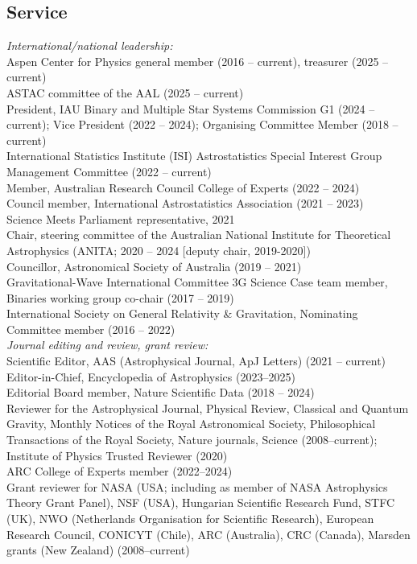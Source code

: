 \documentclass[margin,line]{res}
\begin{document}
\begin{resume}
\section{\sc Service}

{\it International/national leadership:}\\
Aspen Center for Physics general member (2016 -- current), treasurer (2025 -- current)\\
ASTAC committee of the AAL (2025 -- current)\\
President, IAU Binary and Multiple Star Systems Commission G1 (2024 -- current); Vice President (2022 -- 2024); Organising Committee Member (2018 -- current)\\
International Statistics Institute (ISI) Astrostatistics Special Interest Group Management Committee (2022 -- current)\\
Member, Australian Research Council College of Experts (2022 -- 2024)\\
Council member, International Astrostatistics Association (2021 -- 2023)\\
Science Meets Parliament representative, 2021\\
Chair, steering committee of the Australian National Institute for Theoretical Astrophysics (ANITA; 2020 -- 2024 [deputy chair, 2019-2020])\\
Councillor, Astronomical Society of Australia (2019 -- 2021)\\
Gravitational-Wave International Committee 3G Science Case team member, Binaries working group co-chair (2017 -- 2019)\\
International Society on General Relativity \& Gravitation, Nominating Committee member (2016 -- 2022)\\

{\it Journal editing and review, grant review:}\\
Scientific Editor, AAS (Astrophysical Journal, ApJ Letters) (2021 -- current)\\
Editor-in-Chief, Encyclopedia of Astrophysics (2023--2025)\\
Editorial Board member, Nature Scientific Data (2018 -- 2024)\\
Reviewer for the Astrophysical Journal, Physical Review, Classical and Quantum Gravity, Monthly Notices of the Royal Astronomical Society, Philosophical Transactions of the Royal Society, Nature journals, Science (2008--current); Institute of Physics Trusted Reviewer (2020) \\
ARC College of Experts member (2022--2024)\\
Grant reviewer for NASA (USA; including as member of NASA Astrophysics Theory Grant Panel), NSF (USA), Hungarian Scientific Research Fund, STFC (UK), NWO (Netherlands Organisation for Scientific Research), European Research Council, CONICYT (Chile), ARC (Australia), CRC (Canada), Marsden grants (New Zealand) (2008--current)\\


\end{resume}
\end{document}
